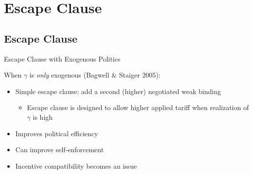 \documentclass{beamer}
\newcommand{\bta}{\bm{\tau^a}}
\newcommand{\btn}{\bm{\tau^{tw}}}
\newcommand{\ga}{\gamma}
\begin{document}
{


\section{Escape Clause}
\subsection{Escape Clause}
\begin{frame}{Escape Clause with Exogenous Politics}

\pause
When $\ga$ is \textit{only} exogenous (Bagwell $\&$ Staiger 2005):

\pause
\begin{itemize}[<+->]
	\item Simple escape clause: add a second (higher) negotiated weak binding
		\begin{itemize}
			\item Escape clause is designed to allow higher applied tariff when realization of $\ga$ is high
		\end{itemize}
	\item Improves political efficiency
	\item Can improve self-enforcement
	\item Incentive compatibility becomes an issue
\end{itemize}
\end{frame}


}
\end{document}
